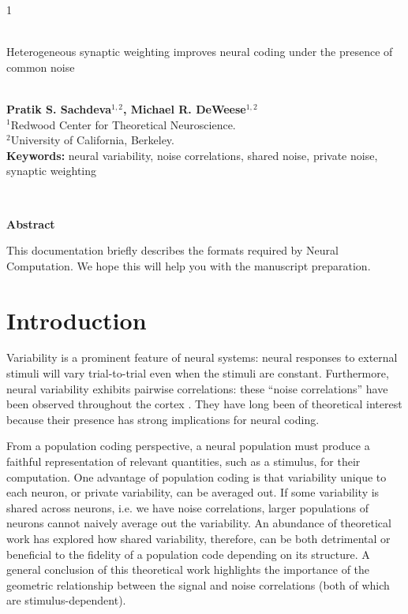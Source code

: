 \documentclass[12pt]{article}
\begin{document}
\hspace{13.9cm}1

\ \vspace{20mm}\\

{\LARGE Heterogeneous synaptic weighting improves neural coding under the presence of common noise}

\ \\
{\bf \large Pratik S. Sachdeva$^{\displaystyle 1, \displaystyle 2}$, Michael R. DeWeese$^{\displaystyle 1, \displaystyle 2}$}\\
{$^{\displaystyle 1}$Redwood Center for Theoretical Neuroscience.}\\
{$^{\displaystyle 2}$University of California, Berkeley.}\\
%

{\bf Keywords:} neural variability, noise correlations, shared noise, private noise, synaptic weighting

\thispagestyle{empty}
%
\ \vspace{-0mm}\\
%
\begin{center} {\bf Abstract} \end{center}
This documentation briefly describes the formats required by Neural Computation. We hope this will help you with the manuscript preparation.

\section{Introduction}
Variability is a prominent feature of neural systems: neural responses to external stimuli will vary trial-to-trial even when the stimuli are constant. Furthermore, neural variability exhibits pairwise correlations: these ``noise correlations'' have been observed throughout the cortex \citep{averbeck2006, cohen2011}. They have long been of theoretical interest because their presence has strong implications for neural coding.

From a population coding perspective, a neural population must produce a faithful representation of relevant quantities, such as a stimulus, for their computation. One advantage of population coding is that variability unique to each neuron, or private variability, can be averaged out. If some variability is shared across neurons, i.e. we have noise correlations, larger populations of neurons cannot naively average out the variability. An abundance of theoretical work has explored how shared variability, therefore, can be both detrimental or beneficial to the fidelity of a population code depending on its structure. A  general conclusion of this theoretical work highlights the importance of the geometric relationship between the signal and noise correlations (both of which are stimulus-dependent).
\end{document}
